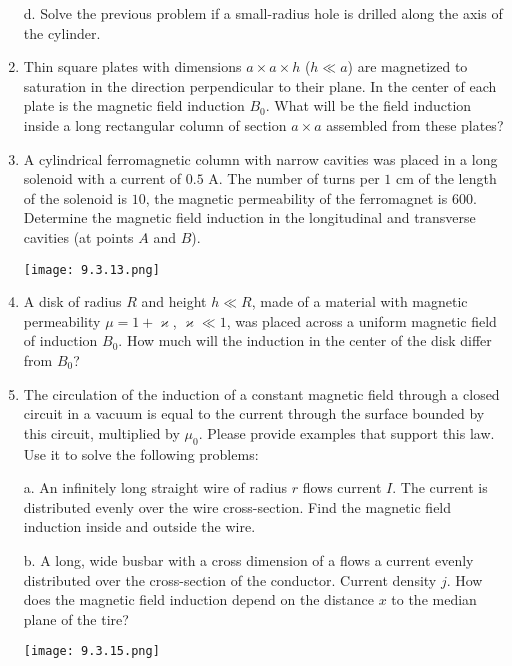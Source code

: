 \documentclass{article}
\begin{document}
\begin{enumerate}[label=9.3.\arabic*]
d. Solve the previous problem if a small-radius hole is drilled along the axis of the cylinder.

\item Thin square plates with dimensions $a \times a \times h$ ($h \ll a$) are magnetized to saturation in the direction perpendicular to their plane. In the center of each plate is the magnetic field induction $B_0$. What will be the field induction inside a long rectangular column of section $a \times a$ assembled from these plates?

\item A cylindrical ferromagnetic column with narrow cavities was placed in a long solenoid with a current of $0.5$ A. The number of turns per $1$ cm of the length of the solenoid is $10$, the magnetic permeability of the ferromagnet is $600$. Determine the magnetic field induction in the longitudinal and transverse cavities (at points $A$ and $B$).

\begin{center}
    \texttt{[image: 9.3.13.png]}
\end{center}

\item A disk of radius $R$ and height $h \ll R$, made of a material with magnetic permeability $\mu = 1 + \varkappa$, $\varkappa \ll 1$, was placed across a uniform magnetic field of induction $B_0$. How much will the induction in the center of the disk differ from $B_0$?

\item The circulation of the induction of a constant magnetic field through a closed circuit in a vacuum is equal to the current through the surface bounded by this circuit, multiplied by $\mu_0$. Please provide examples that support this law. Use it to solve the following problems: 

a. An infinitely long straight wire of radius $r$ flows current $I$. The current is distributed evenly over the wire cross-section. Find the magnetic field induction inside and outside the wire. 

b. A long, wide busbar with a cross dimension of a flows a current evenly distributed over the cross-section of the conductor. Current density $j$. How does the magnetic field induction depend on the distance $x$ to the median plane of the tire?

\begin{center}
    \texttt{[image: 9.3.15.png]}
\end{center}


\end{enumerate}
\end{document}

